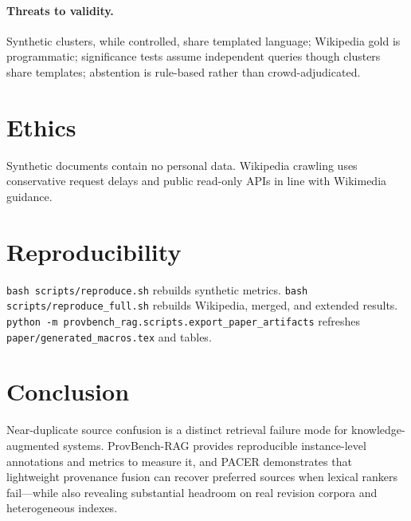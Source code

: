 \documentclass[sigconf,anonymous,review]{acmart}
\begin{document}
\paragraph{Threats to validity.}
Synthetic clusters, while controlled, share templated language; Wikipedia gold is programmatic; significance tests assume independent queries though clusters share templates; abstention is rule-based rather than crowd-adjudicated.

\section{Ethics}
Synthetic documents contain no personal data.
Wikipedia crawling uses conservative request delays and public read-only APIs in line with Wikimedia guidance.

\section{Reproducibility}
\texttt{bash scripts/reproduce.sh} rebuilds synthetic metrics.
\texttt{bash scripts/reproduce\_full.sh} rebuilds Wikipedia, merged, and extended results.
\texttt{python -m provbench\_rag.scripts.export\_paper\_artifacts} refreshes \texttt{paper/generated\_macros.tex} and tables.

\section{Conclusion}
Near-duplicate source confusion is a distinct retrieval failure mode for knowledge-augmented systems.
ProvBench-RAG provides reproducible instance-level annotations and metrics to measure it, and PACER demonstrates that lightweight provenance fusion can recover preferred sources when lexical rankers fail---while also revealing substantial headroom on real revision corpora and heterogeneous indexes.




\end{document}
